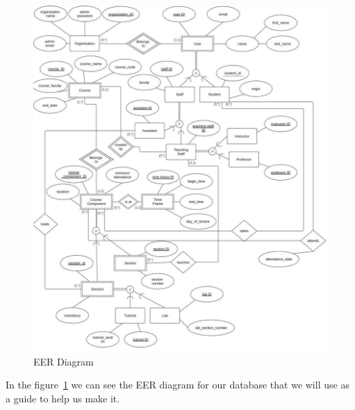 \documentclass[a4paper, 12pt]{article}
\begin{document}
      \begin{figure}[h]
        \centering
        \includegraphics[width=.85\linewidth]{EER_Diagram.jpg}
        \caption{EER Diagram}

        \label{fig:eer-diagram}
      \end{figure}

      \newpage

      \noindent In the figure~\ref{fig:eer-diagram} we can see the EER diagram for our database that we will use as a guide to help us make it.
\end{document}
